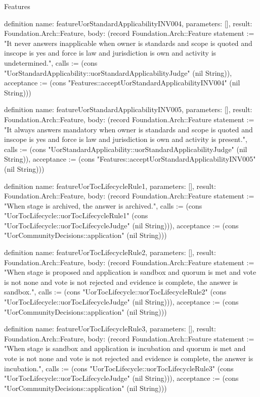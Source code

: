 \begin{lexlean}{Features}
\begin{semanticmodule}
definition{
  name: featureUorStandardApplicabilityINV004,
  parameters: [],
  result: Foundation.Arch::Feature,
  body: (record Foundation.Arch::Feature {statement := "It never answers inapplicable when owner is standards and scope is quoted and inscope is yes and force is law and jurisdiction is own and activity is undetermined.", calls := (cons "UorStandardApplicability::uorStandardApplicabilityJudge" (nil String)), acceptance := (cons "Features::acceptUorStandardApplicabilityINV004" (nil String))})
}

definition{
  name: featureUorStandardApplicabilityINV005,
  parameters: [],
  result: Foundation.Arch::Feature,
  body: (record Foundation.Arch::Feature {statement := "It always answers mandatory when owner is standards and scope is quoted and inscope is yes and force is law and jurisdiction is own and activity is present.", calls := (cons "UorStandardApplicability::uorStandardApplicabilityJudge" (nil String)), acceptance := (cons "Features::acceptUorStandardApplicabilityINV005" (nil String))})
}

definition{
  name: featureUorTocLifecycleRule1,
  parameters: [],
  result: Foundation.Arch::Feature,
  body: (record Foundation.Arch::Feature {statement := "When stage is archived, the answer is archived.", calls := (cons "UorTocLifecycle::uorTocLifecycleRule1" (cons "UorTocLifecycle::uorTocLifecycleJudge" (nil String))), acceptance := (cons "UorCommunityDecisions::application" (nil String))})
}

definition{
  name: featureUorTocLifecycleRule2,
  parameters: [],
  result: Foundation.Arch::Feature,
  body: (record Foundation.Arch::Feature {statement := "When stage is proposed and application is sandbox and quorum is met and vote is not none and vote is not rejected and evidence is complete, the answer is sandbox.", calls := (cons "UorTocLifecycle::uorTocLifecycleRule2" (cons "UorTocLifecycle::uorTocLifecycleJudge" (nil String))), acceptance := (cons "UorCommunityDecisions::application" (nil String))})
}

definition{
  name: featureUorTocLifecycleRule3,
  parameters: [],
  result: Foundation.Arch::Feature,
  body: (record Foundation.Arch::Feature {statement := "When stage is sandbox and application is incubation and quorum is met and vote is not none and vote is not rejected and evidence is complete, the answer is incubation.", calls := (cons "UorTocLifecycle::uorTocLifecycleRule3" (cons "UorTocLifecycle::uorTocLifecycleJudge" (nil String))), acceptance := (cons "UorCommunityDecisions::application" (nil String))})
}


\end{semanticmodule}
\end{lexlean}
